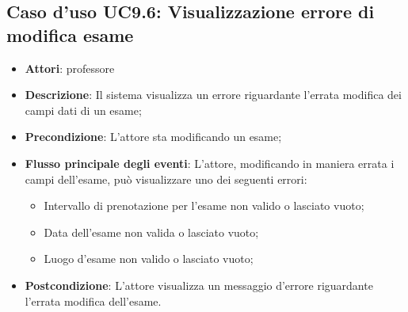 \subsection{Caso d'uso \texorpdfstring{UC9.6}{UC9.6}: Visualizzazione errore di modifica esame}
\begin{itemize}
\item \textbf{Attori}: professore
\item \textbf{Descrizione}: Il sistema visualizza un errore riguardante l'errata modifica dei campi dati di un esame;
\item \textbf{Precondizione}: L'attore sta modificando un esame;
\item \textbf{Flusso principale degli eventi}: L'attore, modificando in maniera errata i campi dell'esame, può visualizzare uno dei seguenti errori: 
\begin{itemize} \item Intervallo di prenotazione per l’esame non valido o lasciato vuoto; \item Data dell’esame non valida o lasciato vuoto; \item Luogo d’esame non valido o lasciato vuoto; 
\end{itemize}
\item \textbf{Postcondizione}: L'attore visualizza un messaggio d'errore riguardante l'errata modifica dell'esame.
\end{itemize}

